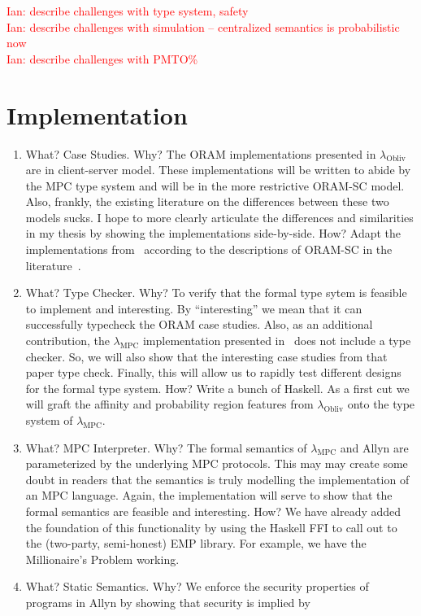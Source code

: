 \documentclass{report}
\newcommand{\lang}{Allyn\xspace}
\newcommand{\mpc}{\ensuremath{\lambda_{\mathrm{MPC}}}\xspace}
\newcommand{\obliv}{\ensuremath{\lambda_{\mathrm{Obliv}}}\xspace}
\newcommand{\ins}[1]{\textcolor{red}{Ian: #1}}
\begin{document}
\ins{describe challenges with type system, safety} \\
\ins{describe challenges with simulation -- centralized semantics is probabilistic now} \\
\ins{describe challenges with PMTO\%} \\

\section{Implementation}

\begin{enumerate}
\item What? Case Studies. Why? The ORAM implementations presented in \obliv are in client-server model. These implementations will
  be written to abide by the MPC type system and will be in the more restrictive ORAM-SC model. Also, frankly, the existing literature
  on the differences between these two models sucks. I hope to more clearly articulate the differences and similarities in my thesis
  by showing the implementations side-by-side. How? Adapt the implementations from~\citet{lam-obliv} according to the descriptions of
  ORAM-SC in the literature~\cite{}.
\item What? Type Checker. Why? To verify that the formal type sytem is feasible to implement and interesting. By ``interesting'' we mean
  that it can successfully typecheck the ORAM case studies. Also, as an additional contribution, the \mpc implementation presented
  in~\citet{symphony} does not include a type checker. So, we will also show that the interesting case studies from that paper type check.
  Finally, this will allow us to rapidly test different designs for the formal type system. How? Write a bunch of Haskell. As a first cut
  we will graft the affinity and probability region features from \obliv onto the type system of \mpc.
\item What? MPC Interpreter. Why? The formal semantics of \mpc and \lang are parameterized by the underlying MPC protocols. This may
  may create some doubt in readers that the semantics is truly modelling the implementation of an MPC language. Again, the implementation
  will serve to show that the formal semantics are feasible and interesting. How? We have already added the foundation of this functionality
  by using the Haskell FFI to call out to the (two-party, semi-honest) EMP library. For example, we have the Millionaire's Problem working.
\item What? Static Semantics. Why? We enforce the security properties of programs in \lang by showing that security is implied by

\end{enumerate}
\end{document}
